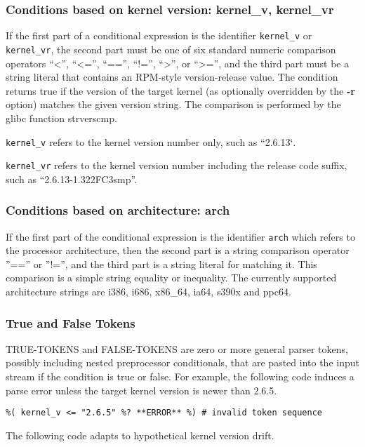 \documentclass[twoside,english]{article}
\newenvironment{vindent}
{\begin{list}{}{\setlength{\listparindent}{6pt}}
\item[]}
{\end{list}}
\begin{document}
\subsubsection{Conditions based on kernel version: kernel\_v, kernel\_vr}
If the first part of a conditional expression is the identifier \texttt{kernel\_v}
or \texttt{kernel\_vr}, the second part must be one of six standard numeric
comparison operators {}``\textless'', {}``\textless ='', {}``=='', {}``!='', {}``\textgreater'',
or {}``\textgreater ='',
and the third part must be a string literal that contains an RPM-style version-release
value. The condition returns true if the version of the target kernel (as
optionally overridden by the \textbf{-r} option) matches the given version
string. The comparison is performed by the glibc function strverscmp.

\texttt{kernel\_v} refers to the kernel version number only, such as {}``2.6.13\char`\"{}.

\texttt{kernel\_vr} refers to the kernel version number including the release
code suffix, such as {}``2.6.13-1.322FC3smp''.


\subsubsection{Conditions based on architecture: arch}
If the first part of the conditional expression is the identifier \texttt{arch}
which refers to the processor architecture, then the second part is a string
comparison operator ''=='' or ''!='', and the third part is a string
literal for matching it. This comparison is a simple string equality or inequality.
The currently supported architecture strings are i386, i686, x86\_64, ia64,
s390x and ppc64.


\subsubsection{True and False Tokens}
TRUE-TOKENS and FALSE-TOKENS are zero or more general parser tokens, possibly
including nested preprocessor conditionals, that are pasted into the input
stream if the condition is true or false. For example, the following code
induces a parse error unless the target kernel version is newer than 2.6.5.

\begin{vindent}
\begin{verbatim}
%( kernel_v <= "2.6.5" %? **ERROR** %) # invalid token sequence
\end{verbatim}
\end{vindent}
The following code adapts to hypothetical kernel version drift.
\end{document}
